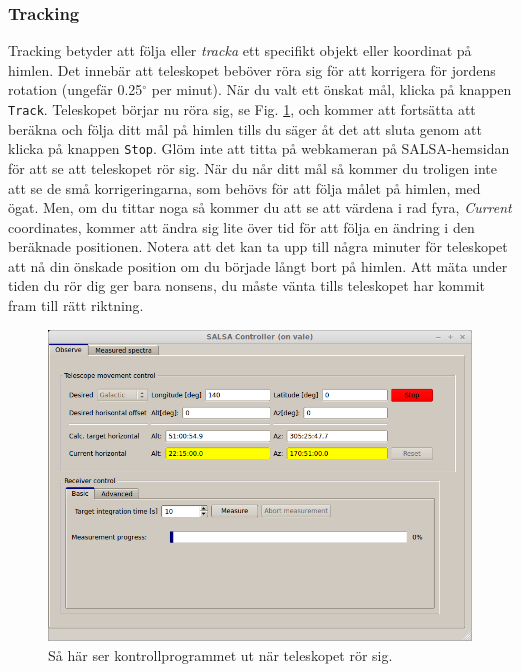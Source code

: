 \subsubsection{Tracking}
Tracking betyder att följa eller \emph{tracka} ett specifikt objekt
eller koordinat på himlen. Det innebär att teleskopet beböver röra sig för att
korrigera för jordens rotation (ungefär 0.25$^\circ$ per minut). När du valt
ett önskat mål, klicka på knappen {\tt Track}. Teleskopet börjar nu röra sig, se
Fig. \ref{fig:controlmove}, och kommer att fortsätta att beräkna och följa ditt mål
på himlen tills du säger åt det att sluta genom att klicka på knappen {\tt Stop}.  
Glöm inte att titta på webkameran på SALSA-hemsidan för att se att teleskopet rör sig. 
När du når ditt mål så kommer du troligen inte att se de små korrigeringarna, 
som behövs för att följa målet på himlen, med ögat. Men, om du tittar noga
så kommer du att se att värdena i rad fyra, \emph{Current} coordinates, kommer
att ändra sig lite över tid för att följa en ändring i den beräknade positionen.
Notera att det kan ta upp till några minuter för teleskopet att nå din önskade 
position om du började långt bort på himlen. Att mäta under tiden du rör dig
ger bara nonsens, du måste vänta tills teleskopet har kommit fram till rätt
riktning. 
\begin{figure}[ht]
\begin{center}
\includegraphics[width=\textwidth]{../figures/Controller_move.png}
\end{center}
\caption{Så här ser kontrollprogrammet ut när teleskopet rör sig.}
\label{fig:controlmove}
\end{figure}

